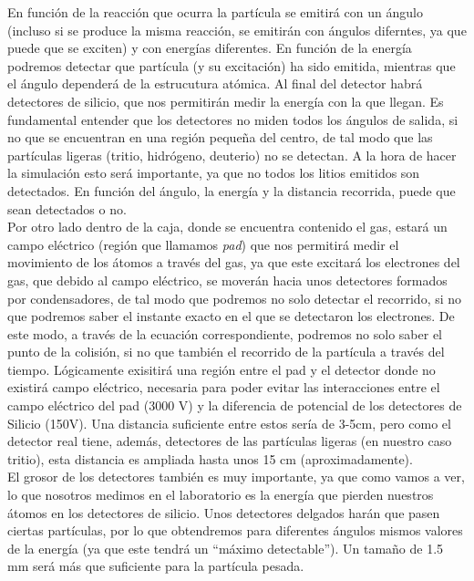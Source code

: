 \documentclass[12pt,a4paper]{article}
\numberwithin{equation}{section}
\numberwithin{figure}{section}
\begin{document}
En función de la reacción que ocurra la partícula se emitirá con un ángulo (incluso si se produce la misma reacción, se emitirán con ángulos diferntes, ya que puede que se exciten) y con energías diferentes. En función de la energía podremos detectar que partícula (y su excitación) ha sido emitida, mientras que el ángulo dependerá de la estrucutura atómica. Al final del detector habrá detectores de silicio, que nos permitirán medir la energía con la que llegan. Es fundamental entender que los detectores no miden todos los ángulos de salida, si no que se encuentran en una región pequeña del centro, de tal modo que las partículas ligeras (tritio, hidrógeno, deuterio) no se detectan. A la hora de hacer la simulación esto será importante, ya que no todos los litios emitidos son detectados. En función del ángulo, la energía y la distancia recorrida, puede que sean detectados o no. \\

Por otro lado dentro de la caja, donde se encuentra contenido el gas, estará un campo eléctrico (región que llamamos {\it pad}) que nos permitirá medir el movimiento de los átomos a través del gas, ya que este excitará los electrones del gas, que debido al campo eléctrico, se moverán hacia unos detectores formados por condensadores, de tal modo que podremos no solo detectar el recorrido, si no que podremos saber el instante exacto en el que se detectaron los electrones. De este modo, a través de la ecuación correspondiente, podremos no solo saber el punto de la colisión, si no que también el recorrido de la partícula a través del tiempo. Lógicamente exisitirá una región entre el pad y el detector donde no existirá campo eléctrico, necesaria para poder evitar las interacciones entre el campo eléctrico del pad (3000 V) y la diferencia de potencial de los detectores de Silicio (150V). Una distancia suficiente entre estos sería de 3-5cm, pero como el detector real tiene, además, detectores de las partículas ligeras (en nuestro caso tritio), esta distancia es ampliada hasta unos 15 cm (aproximadamente).  \\

El grosor de los detectores también es muy importante, ya que como vamos a ver, lo que nosotros medimos en el laboratorio es la energía que pierden nuestros átomos en los detectores de silicio. Unos detectores delgados harán que pasen ciertas partículas, por lo que obtendremos para diferentes ángulos mismos valores de la energía (ya que este tendrá un ``máximo detectable''). Un tamaño de 1.5 mm será más que suficiente para la partícula pesada. 
\end{document}
